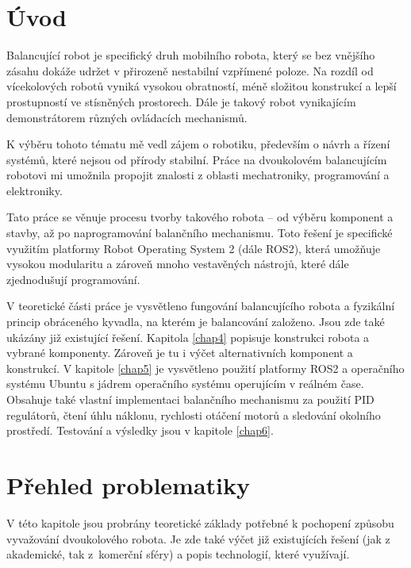 
%

\chapter{Úvod}
Balancující robot je specifický druh mobilního robota, který se bez vnějšího zásahu dokáže udržet v přirozeně nestabilní vzpřímené poloze. Na rozdíl od vícekolových robotů vyniká vysokou obratností, méně složitou konstrukcí a lepší prostupností ve stísněných prostorech. Dále je takový robot vynikajícím demonstrátorem různých ovládacích mechanismů.

K výběru tohoto tématu mě vedl zájem o robotiku, především o návrh a řízení systémů, které nejsou od přírody stabilní. Práce na dvoukolovém balancujícím robotovi mi umožnila propojit znalosti z oblasti mechatroniky, programování a elektroniky.

Tato práce se věnuje procesu tvorby takového robota -- od výběru komponent a stavby, až po naprogramování balančního mechanismu. Toto řešení je specifické využitím platformy Robot Operating System 2 (dále ROS2), která umožňuje vysokou modularitu a zároveň mnoho vestavěných nástrojů, které dále zjednodušují programování.

V teoretické části práce je vysvětleno fungování balancujícího robota a fyzikální princip obráceného kyvadla, na kterém je balancování založeno. Jsou zde také
ukázány již existující řešení. Kapitola \ref{chap4} popisuje konstrukci robota a vybrané komponenty. Zároveň je tu i výčet alternativních komponent a konstrukcí. V kapitole \ref{chap5} je vysvětleno použití platformy ROS2 a operačního systému Ubuntu s jádrem operačního systému operujícím v reálném čase. Obsahuje také vlastní implementaci balančního mechanismu za použití PID regulátorů, čtení úhlu náklonu, rychlosti otáčení motorů a sledování okolního prostředí. Testování a výsledky jsou v kapitole \ref{chap6}.
\chapter{Přehled problematiky}
\label{chap2}
V této kapitole jsou probrány teoretické základy potřebné k pochopení způsobu vyvažování dvoukolového robota. Je zde také výčet již existujících řešení (jak z akademické, tak z~komerční sféry) a popis technologií, které využívají.

